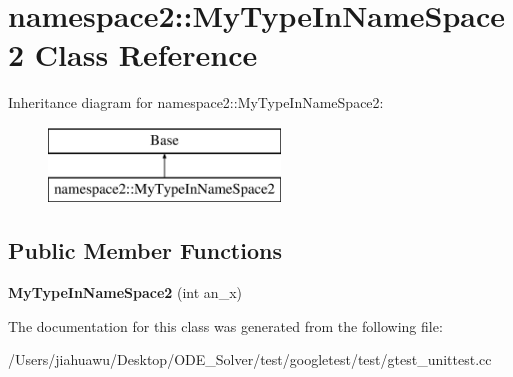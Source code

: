 \hypertarget{classnamespace2_1_1_my_type_in_name_space2}{}\section{namespace2\+:\+:My\+Type\+In\+Name\+Space2 Class Reference}
\label{classnamespace2_1_1_my_type_in_name_space2}
Inheritance diagram for namespace2\+:\+:My\+Type\+In\+Name\+Space2\+:\begin{figure}[H]
\begin{center}
\leavevmode
\includegraphics[height=2.000000cm]{classnamespace2_1_1_my_type_in_name_space2}
\end{center}
\end{figure}
\subsection*{Public Member Functions}
\begin{DoxyCompactItemize}
\item 
\mbox{\label{classnamespace2_1_1_my_type_in_name_space2_a033025628289dbf29022b2bfbe66f53e}} 
{\bfseries My\+Type\+In\+Name\+Space2} (int an\+\_\+x)
\end{DoxyCompactItemize}


The documentation for this class was generated from the following file\+:\begin{DoxyCompactItemize}
\item 
/\+Users/jiahuawu/\+Desktop/\+O\+D\+E\+\_\+\+Solver/test/googletest/test/gtest\+\_\+unittest.\+cc\end{DoxyCompactItemize}

